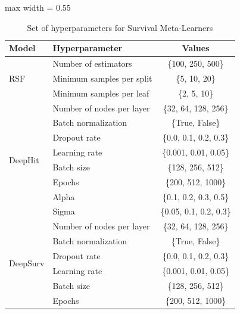 \documentclass{article} %
\begin{document}
\begin{table}[htbp]
\centering
\footnotesize
\setlength{\tabcolsep}{4pt}
\caption{Set of hyperparameters for Survival Meta-Learners} \label{tab:hyperparam-base-surv}
\begin{adjustbox}{max width = 0.55\textwidth}
\begin{tabular}{l l c}
\toprule
\textbf{Model}         & \textbf{Hyperparameter}             & \textbf{Values} \\ \midrule
\multirow{3}{*}{RSF}   & Number of estimators                & \{100, 250, 500\}   \\
                       & Minimum samples per split           & \{5, 10, 20\}       \\
                       & Minimum samples per leaf            & \{2, 5, 10\}        \\ \midrule
\multirow{8}{*}{DeepHit} 
                       & Number of nodes per layer           & \{32, 64, 128, 256\} \\
                       & Batch normalization                 & \{True, False\}       \\
                       & Dropout rate                        & \{0.0, 0.1, 0.2, 0.3\} \\
                       & Learning rate                       & \{0.001, 0.01, 0.05\} \\
                       & Batch size                          & \{128, 256, 512\}    \\
                       & Epochs                              & \{200, 512, 1000\}   \\
                       & Alpha                               & \{0.1, 0.2, 0.3, 0.5\} \\
                       & Sigma                               & \{0.05, 0.1, 0.2, 0.3\} \\ \midrule
\multirow{6}{*}{DeepSurv} 
                       & Number of nodes per layer           & \{32, 64, 128, 256\} \\
                       & Batch normalization                 & \{True, False\}       \\
                       & Dropout rate                        & \{0.0, 0.1, 0.2, 0.3\} \\
                       & Learning rate                       & \{0.001, 0.01, 0.05\} \\
                       & Batch size                          & \{128, 256, 512\}    \\
                       & Epochs                              & \{200, 512, 1000\}   \\ \bottomrule
\end{tabular}
\end{adjustbox}
\end{table}
\end{document}
